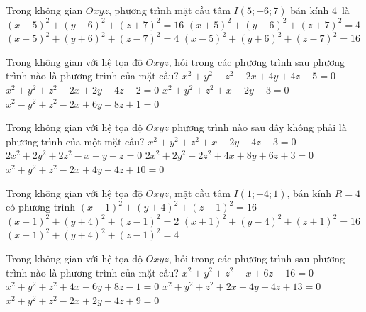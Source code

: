 \begin{ex}%
	Trong không gian $ Oxyz$, phương trình mặt  cầu tâm ${I}\left(5;-6;7\right)$ bán kính 4~là
	 \choice
		 {$(x+5)^2+(y-6)^2+(z+7)^2=16$}
		{$(x+5)^2+(y-6)^2+(z+7)^2=4$} 
		 {$(x-5)^2+(y+6)^2+(z-7)^2=4$}
		{\True $(x-5)^2+(y+6)^2+(z-7)^2=16$} 
\end{ex}

\begin{ex}%
	 Trong không gian với hệ tọa độ $Oxyz$, hỏi trong các phương trình sau phương trình nào là phương trình của mặt cầu?
	\choice 
		{$x^2+y^2-z^2-2x+4y+4z+5=0$} 
		 {\True $x^2+y^2+z^2-2x+2y-4z-2=0$}
		{$x^2+y^2+z^2+x-2y+3=0$} 
		{$x^2-y^2+z^2-2x+6y-8z+1=0$} 
\end{ex}

\begin{ex}%
	Trong không gian với hệ tọa độ $Oxyz$ phương  trình nào sau đây không phải là phương trình của một mặt cầu?
	 \choice
		{$x^2+y^2+z^2+x-2y+4z-3=0$} 
		 {$2x^2+2y^2+2z^2-x-y-z=0$}
		 {$2x^2+2y^2+2z^2+4x+8y+6z+3=0$}
		{\True  $x^2+y^2+z^2-2x+4y-4z+10=0$}
\end{ex}

\begin{ex}%
	Trong không gian với hệ tọa độ  $Oxyz$, mặt cầu tâm $I(1; -4; 1)$, bán kính $R=4$ có phương trình
	 \choice
		{\True $(x-1)^2 + (y+4)^2 +  (z-1)^2 = 16$}
		 {$(x-1)^2 + (y+4)^2 + (z-1)^2 = 2$}
		{$(x+1)^2 + (y-4)^2 +  (z+1)^2 = 16$}
		{$(x-1)^2 + (y+4)^2  + (z-1)^2 = 4$}
\end{ex}

\begin{ex}%
	Trong không  gian với hệ tọa độ $Oxyz$, hỏi trong các phương trình sau phương trình nào là phương trình của mặt cầu?
	 \choice
		 {$x^2+y^2+z^2-x+6z+16=0$}
		{\True $x^2+y^2+z^2+4x-6y+8z-1=0$} 
		 {$x^2+y^2+z^2+2x-4y+4z+13=0$}
		 {$x^2+y^2+z^2-2x+2y-4z+9=0$}
\end{ex}

